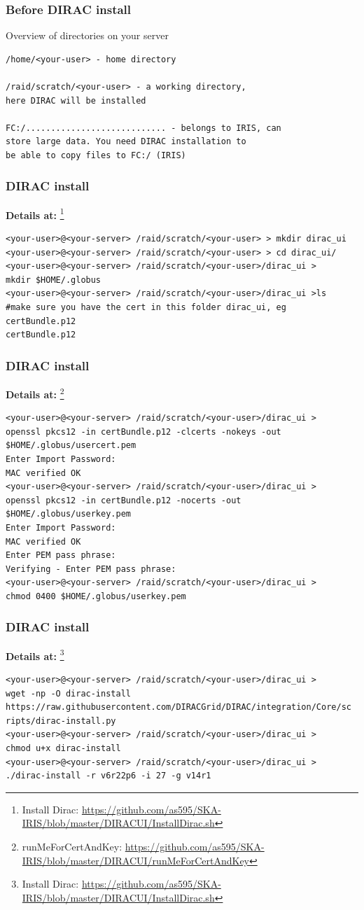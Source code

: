 \documentclass{beamer}
\begin{document}
\begin{frame}[fragile]
\frametitle{Before DIRAC install}
\textbf{}{Overview of directories on your server}
\begin{verbatim}
/home/<your-user> - home directory

/raid/scratch/<your-user> - a working directory,
here DIRAC will be installed

FC:/............................ - belongs to IRIS, can
store large data. You need DIRAC installation to
be able to copy files to FC:/ (IRIS)

\end{verbatim}

\end{frame}


\begin{frame}[fragile]
\frametitle{ DIRAC install}
\textbf{Details at:} \footnote {Install Dirac: \url{https://github.com/as595/SKA-IRIS/blob/master/DIRACUI/InstallDirac.sh}}
\begin{verbatim}
<your-user>@<your-server> /raid/scratch/<your-user> > mkdir dirac_ui
<your-user>@<your-server> /raid/scratch/<your-user> > cd dirac_ui/
<your-user>@<your-server> /raid/scratch/<your-user>/dirac_ui >
mkdir $HOME/.globus
<your-user>@<your-server> /raid/scratch/<your-user>/dirac_ui >ls
#make sure you have the cert in this folder dirac_ui, eg certBundle.p12
certBundle.p12 
\end{verbatim}
\end{frame}

\begin{frame}[fragile]
\frametitle{ DIRAC install}
\textbf{Details at:} \footnote{runMeForCertAndKey: \url{https://github.com/as595/SKA-IRIS/blob/master/DIRACUI/runMeForCertAndKey}}
\begin{verbatim}
<your-user>@<your-server> /raid/scratch/<your-user>/dirac_ui > 
openssl pkcs12 -in certBundle.p12 -clcerts -nokeys -out 
$HOME/.globus/usercert.pem
Enter Import Password:
MAC verified OK
<your-user>@<your-server> /raid/scratch/<your-user>/dirac_ui > 
openssl pkcs12 -in certBundle.p12 -nocerts -out 
$HOME/.globus/userkey.pem
Enter Import Password:
MAC verified OK
Enter PEM pass phrase:
Verifying - Enter PEM pass phrase:
<your-user>@<your-server> /raid/scratch/<your-user>/dirac_ui > 
chmod 0400 $HOME/.globus/userkey.pem
\end{verbatim}
\end{frame}


\begin{frame}[fragile]
\frametitle{ DIRAC install}
\textbf{Details at:} \footnote {Install Dirac: \url{https://github.com/as595/SKA-IRIS/blob/master/DIRACUI/InstallDirac.sh}}
\begin{verbatim}
<your-user>@<your-server> /raid/scratch/<your-user>/dirac_ui > 
wget -np -O dirac-install
https://raw.githubusercontent.com/DIRACGrid/DIRAC/integration/Core/sc
ripts/dirac-install.py
<your-user>@<your-server> /raid/scratch/<your-user>/dirac_ui > 
chmod u+x dirac-install
<your-user>@<your-server> /raid/scratch/<your-user>/dirac_ui > 
./dirac-install -r v6r22p6 -i 27 -g v14r1
\end{verbatim}
\end{frame}
\end{document}
